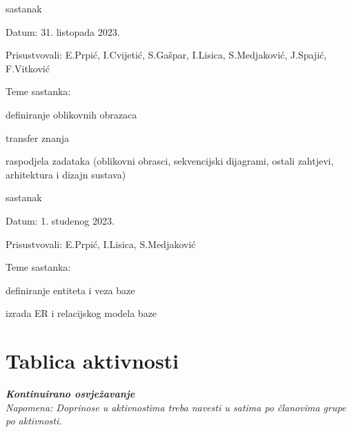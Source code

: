 \begin{packed_enum}
			\item  sastanak
			\item[] \begin{packed_item}
				\item Datum: 31. listopada 2023.
				\item Prisustvovali: E.Prpić, I.Cvijetić, S.Gašpar, I.Lisica, S.Medjaković, J.Spajić, F.Vitković
				\item Teme sastanka:
				\begin{packed_item}
					\item  definiranje oblikovnih obrazaca
					\item  transfer znanja
					\item  raspodjela zadataka (oblikovni obrasci, sekvencijski dijagrami, ostali zahtjevi, arhitektura i dizajn sustava)
				\end{packed_item}
			\end{packed_item}
			
			\item  sastanak
			\item[] \begin{packed_item}
				\item Datum: 1. studenog 2023.
				\item Prisustvovali: E.Prpić, I.Lisica, S.Medjaković
				\item Teme sastanka:
				\begin{packed_item}
					\item  definiranje entiteta i veza baze
					\item  izrada ER i relacijskog modela baze
				\end{packed_item}
			\end{packed_item}
		\end{packed_enum}
		
		\eject
		\section*{Tablica aktivnosti}
		
			\textbf{\textit{Kontinuirano osvježavanje}}\\
			
			 \textit{Napomena: Doprinose u aktivnostima treba navesti u satima po članovima grupe po aktivnosti.}

